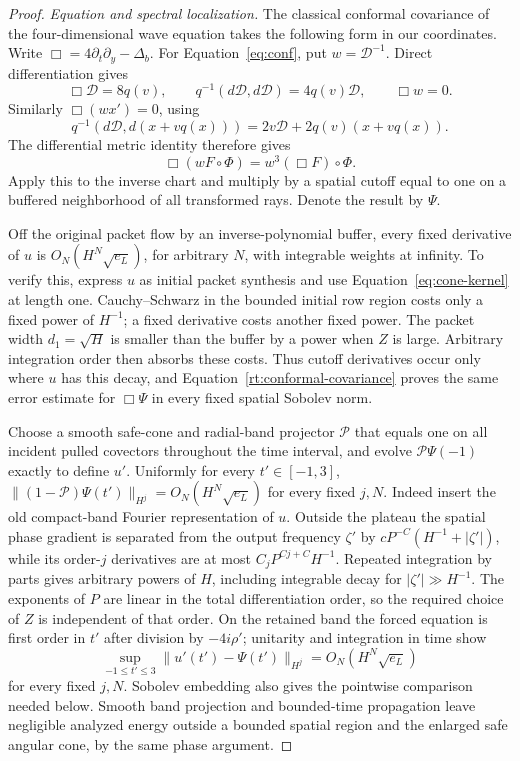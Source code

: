 \begin{proof}
\emph{Equation and spectral localization.}
The classical conformal covariance of the four-dimensional wave equation
\cite[Section~2]{Bateman1909} takes the following form in our coordinates.
Write $\Box=4\partial_t\partial_y-\Delta_b$.
For Equation~\eqref{eq:conf}, put $w=\mathcal D^{-1}$.  Direct
differentiation gives
\[
 \Box\mathcal D=8q(v),\qquad
 q^{-1}(d\mathcal D,d\mathcal D)=4q(v)\mathcal D,
 \qquad \Box w=0.
\]
Similarly $\Box(wx')=0$, using
\[
 q^{-1}(d\mathcal D,d(x+vq(x)))
       =2v\mathcal D+2q(v)(x+vq(x)).
\]
The differential metric identity therefore gives
\begin{equation}\label{rt:conformal-covariance}
 \Box(wF\circ\Phi)=w^3(\Box F)\circ\Phi.
\end{equation}
Apply this to the inverse chart and multiply by a spatial cutoff equal
to one on a buffered neighborhood of all transformed rays.  Denote the
result by $\Psi$.

Off the original packet flow by an inverse-polynomial buffer, every
fixed derivative of $u$ is $O_N(H^N\sqrt{e_L})$, for arbitrary $N$,
with integrable weights at infinity.  To verify this, express $u$ as
initial packet synthesis and use Equation~\eqref{eq:cone-kernel} at
length one.  Cauchy--Schwarz in the bounded initial row region costs
only a fixed power of $H^{-1}$; a fixed derivative costs another fixed
power.  The packet width $d_1=\sqrt H$ is smaller than the buffer by a
power when $Z$ is large.  Arbitrary integration order then absorbs
these costs.  Thus cutoff derivatives occur only where $u$ has this
decay, and Equation~\eqref{rt:conformal-covariance} proves the same
error estimate for $\Box\Psi$ in every fixed spatial Sobolev norm.

Choose a smooth safe-cone and radial-band projector $\mathcal P$ that
equals one on all incident pulled covectors throughout the time interval,
and evolve $\mathcal P\Psi(-1)$ exactly to define $u'$.
Uniformly for every $t'\in[-1,3]$,
$\|(1-\mathcal P)\Psi(t')\|_{H^j}=O_N(H^N\sqrt{e_L})$ for every
fixed $j,N$.
Indeed insert the old compact-band Fourier representation of $u$.
Outside the plateau the spatial phase gradient is separated from
the output frequency $\zeta'$ by
$cP^{-C}(H^{-1}+|\zeta'|)$, while its order-$j$ derivatives are at most
$C_jP^{Cj+C}H^{-1}$.  Repeated integration by parts gives arbitrary
powers of $H$, including integrable decay for $|\zeta'|\gg H^{-1}$.
The exponents of $P$ are linear in the total differentiation order,
so the required choice of $Z$ is independent of that order.
On the retained band the forced equation is first order in $t'$ after
division by $-4i\rho'$; unitarity and integration in time show
\[
 \sup_{-1\le t'\le3}\|u'(t')-\Psi(t')\|_{H^j}
       =O_N(H^N\sqrt{e_L})
\]
for every fixed $j,N$.  Sobolev embedding also gives the pointwise
comparison needed below.  Smooth band projection and bounded-time
propagation leave negligible analyzed energy outside a bounded spatial
region and the enlarged safe angular cone, by the same phase argument.


\end{proof}
